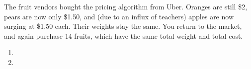 The fruit vendors bought the pricing algorithm from Uber. Oranges are still \$2, pears are now only \$1.50, and (due to an influx of teachers) apples are now surging at \$1.50 each. Their weights stay the same. You return to the market, and again purchase 14 fruits, which have the same total weight and total cost.

\begin{enumerate}
    \item 
    \item 
\end{enumerate}